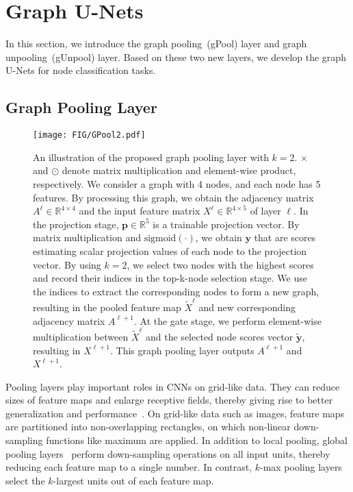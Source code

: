 \documentclass{article}
\begin{document}
\section{Graph U-Nets}

In this section, we introduce the graph pooling~(gPool) layer and
graph unpooling~(gUnpool) layer. Based on these two new layers, we
develop the graph U-Nets for node classification tasks.

\subsection{Graph Pooling Layer}

\begin{figure*}[t] \texttt{[image: FIG/GPool2.pdf]}
\caption{An illustration of the proposed graph pooling layer with
$k=2$. $\times$ and $\odot$ denote matrix multiplication and
element-wise product, respectively. We consider a graph with 4
nodes, and each node has 5 features. By processing this graph, we
obtain the adjacency matrix $A^\ell \in \mathbb{R}^{4 \times 4}$ and
the input feature matrix $X^\ell \in \mathbb{R}^{4 \times 5} $ of
layer $\ell$. In the projection stage, $\mathbf p \in \mathbb{R}^{5}
$ is a trainable projection vector. By matrix multiplication and
$\mbox{sigmoid}(\cdot)$, we obtain $\mathbf y$ that are scores estimating
scalar projection values of each node to the projection vector.
By using $k=2$, we
select two nodes with the highest scores and record their indices in
the top-k-node selection stage. We use the indices to extract the
corresponding nodes to form a new graph, resulting in the pooled
feature map $\tilde X^{\ell}$ and new corresponding adjacency matrix
$A^{\ell+1}$. At the gate stage, we perform element-wise
multiplication between $\tilde X^{\ell}$ and the selected node
scores vector $\mathbf{\tilde y}$, resulting in $X^{\ell+1}$. This
graph pooling layer outputs $A^{\ell+1}$ and $X^{\ell+1}$.} \label{fig:gpool}
\end{figure*}

Pooling layers play important roles in CNNs on grid-like data. They
can reduce sizes of feature maps and enlarge receptive fields,
thereby giving rise to better generalization and
performance~\citep{yu2015multi}. On grid-like data such as images,
feature maps are partitioned into non-overlapping rectangles, on
which non-linear down-sampling functions like maximum are applied.
In addition to local pooling, global pooling
layers~\citep{zhao2015self} perform down-sampling operations on all
input units, thereby reducing each feature map to a single number.
In contrast, $k$-max pooling layers~\citep{blunsom2014convolutional}
select the $k$-largest units out of each feature map.
\end{document}
